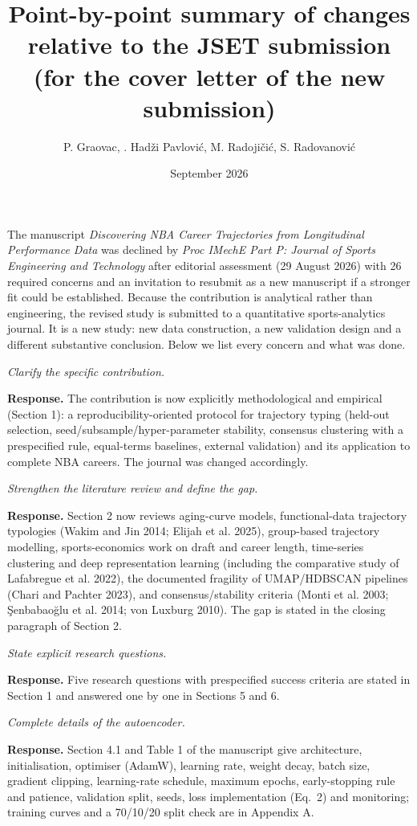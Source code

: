 \documentclass[11pt,a4paper]{article}
\title{Point-by-point summary of changes relative to the JSET submission\\ \large (for the cover letter of the new submission)}
\author{P. Graovac, \DJ. Had\v{z}i Pavlovi\'c, M. Radoji\v{c}i\'c, S. Radovanovi\'c}
\date{September 2026}
\newcommand{\point}[2]{\item[\textbf{#1}] \textit{#2}\par\vspace{2pt}}
\newcommand{\resp}{\par\noindent\textbf{Response.} }
\begin{document}
\maketitle
\noindent The manuscript \emph{Discovering NBA Career Trajectories from Longitudinal Performance Data} was declined by \emph{Proc IMechE Part P: Journal of Sports Engineering and Technology} after editorial assessment (29 August 2026) with 26 required concerns and an invitation to resubmit as a new manuscript if a stronger fit could be established. Because the contribution is analytical rather than engineering, the revised study is submitted to a quantitative sports-analytics journal. It is a new study: new data construction, a new validation design and a different substantive conclusion. Below we list every concern and what was done.

\begin{description}[leftmargin=1.2cm,style=nextline]
\point{1}{Clarify the specific contribution.}
\resp The contribution is now explicitly methodological and empirical (Section 1): a reproducibility-oriented protocol for trajectory typing (held-out selection, seed/subsample/hyper-parameter stability, consensus clustering with a prespecified rule, equal-terms baselines, external validation) and its application to complete NBA careers. The journal was changed accordingly.

\point{2}{Strengthen the literature review and define the gap.}
\resp Section 2 now reviews aging-curve models, functional-data trajectory typologies (Wakim and Jin 2014; Elijah et al. 2025), group-based trajectory modelling, sports-economics work on draft and career length, time-series clustering and deep representation learning (including the comparative study of Lafabregue et al. 2022), the documented fragility of UMAP/HDBSCAN pipelines (Chari and Pachter 2023), and consensus/stability criteria (Monti et al. 2003; \c{S}enbabao\u{g}lu et al. 2014; von Luxburg 2010). The gap is stated in the closing paragraph of Section 2.

\point{3}{State explicit research questions.}
\resp Five research questions with prespecified success criteria are stated in Section 1 and answered one by one in Sections 5 and 6.

\point{4}{Complete details of the autoencoder.}
\resp Section 4.1 and Table 1 of the manuscript give architecture, initialisation, optimiser (AdamW), learning rate, weight decay, batch size, gradient clipping, learning-rate schedule, maximum epochs, early-stopping rule and patience, validation split, seeds, loss implementation (Eq.~2) and monitoring; training curves and a 70/10/20 split check are in Appendix A.


\end{description}
\end{document}

